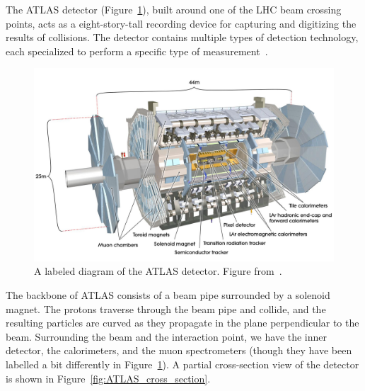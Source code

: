 The ATLAS detector (Figure~\ref{fig:ATLAS}), built around one of the LHC beam crossing points, acts as a eight-story-tall recording device for capturing and digitizing the results of collisions. The detector contains multiple types of detection technology, each specialized to perform a specific type of measurement~\cite{ATLAS_detector}.

\begin{figure}[htbp]
    \centering
    \includegraphics[width=\linewidth]{Images/ATLAS/ATLAS.jpg}
    \caption{A labeled diagram of the ATLAS detector. Figure from~\cite{ATLAS_detector}.}
    \label{fig:ATLAS}
\end{figure}

The backbone of ATLAS consists of a beam pipe surrounded by a solenoid magnet. The protons traverse through the beam pipe and collide, and the resulting particles are curved as they propagate in the plane perpendicular to the beam. Surrounding the beam and the interaction point, we have the inner detector, the calorimeters, and the muon spectrometers (though they have been labelled a bit differently in Figure~\ref{fig:ATLAS}). A partial cross-section view of the detector is shown in Figure~\ref{fig:ATLAS_cross_section}.

